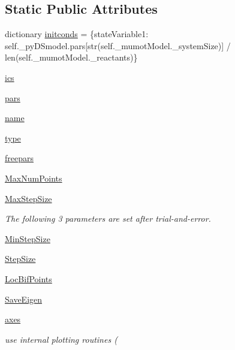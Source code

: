 \subsection*{Static Public Attributes}
\begin{DoxyCompactItemize}
\item 
dictionary \hyperlink{class_mu_mo_t_1_1_mu_mo_tbifurcation_view_a23ca095d6146b220be161f1f73017674}{initconds} = \{state\+Variable1\+: self.\+\_\+py\+D\+Smodel.\+pars\mbox{[}str(self.\+\_\+mumot\+Model.\+\_\+system\+Size)\mbox{]} / len(self.\+\_\+mumot\+Model.\+\_\+reactants)\}
\item 
\hyperlink{class_mu_mo_t_1_1_mu_mo_tbifurcation_view_a08c7b0edb053705a8c47fe487b6f53bd}{ics}
\item 
\hyperlink{class_mu_mo_t_1_1_mu_mo_tbifurcation_view_a372cc7d4f485e77e35668d40b507d0e5}{pars}
\item 
\hyperlink{class_mu_mo_t_1_1_mu_mo_tbifurcation_view_ab74e6bf80237ddc4109968cedc58c151}{name}
\item 
\hyperlink{class_mu_mo_t_1_1_mu_mo_tbifurcation_view_a7aead736a07eaf25623ad7bfa1f0ee2d}{type}
\item 
\hyperlink{class_mu_mo_t_1_1_mu_mo_tbifurcation_view_a15cf90b3888db001a8299a477d50af98}{freepars}
\item 
\hyperlink{class_mu_mo_t_1_1_mu_mo_tbifurcation_view_aaa677c130e36435865b68ff6230a932d}{Max\+Num\+Points}
\item 
\hyperlink{class_mu_mo_t_1_1_mu_mo_tbifurcation_view_a0a7557ffe670b6a318afa8bd9851d2fc}{Max\+Step\+Size}
\begin{DoxyCompactList}\small\item\em The following 3 parameters are set after trial-\/and-\/error. \end{DoxyCompactList}\item 
\hyperlink{class_mu_mo_t_1_1_mu_mo_tbifurcation_view_a5fe506ca005e76a55ccd505a36e17fe6}{Min\+Step\+Size}
\item 
\hyperlink{class_mu_mo_t_1_1_mu_mo_tbifurcation_view_a9c25479455e9bdd389f37c4bccfefea1}{Step\+Size}
\item 
\hyperlink{class_mu_mo_t_1_1_mu_mo_tbifurcation_view_a7ff5325c1fceeebd63c3e4805a2206c8}{Loc\+Bif\+Points}
\item 
\hyperlink{class_mu_mo_t_1_1_mu_mo_tbifurcation_view_a040a7ecbcbaca807aeaec6d5c81801d5}{Save\+Eigen}
\item 
\hyperlink{class_mu_mo_t_1_1_mu_mo_tbifurcation_view_addecde06ced656af71c7c68c4e780fe8}{axes}
\begin{DoxyCompactList}\small\item\em use internal plotting routines ( \end{DoxyCompactList}\item 

\end{DoxyCompactItemize}
